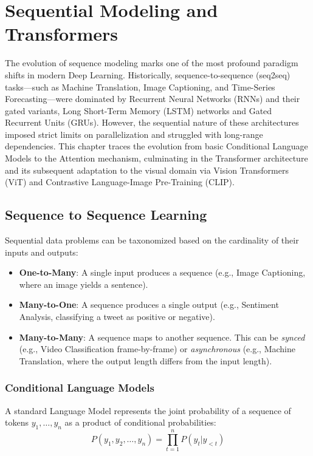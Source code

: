 \chapter{Sequential Modeling and Transformers}
\label{ch:transformers}

The evolution of sequence modeling marks one of the most profound paradigm shifts in modern Deep Learning. Historically, sequence-to-sequence (seq2seq) tasks—such as Machine Translation, Image Captioning, and Time-Series Forecasting—were dominated by Recurrent Neural Networks (RNNs) and their gated variants, Long Short-Term Memory (LSTM) networks and Gated Recurrent Units (GRUs). However, the sequential nature of these architectures imposed strict limits on parallelization and struggled with long-range dependencies. This chapter traces the evolution from basic Conditional Language Models to the Attention mechanism, culminating in the Transformer architecture and its subsequent adaptation to the visual domain via Vision Transformers (ViT) and Contrastive Language-Image Pre-Training (CLIP).

\section{Sequence to Sequence Learning}
\label{sec:seq2seq}

Sequential data problems can be taxonomized based on the cardinality of their inputs and outputs:
\begin{itemize}
    \item \textbf{One-to-Many}: A single input produces a sequence (e.g., Image Captioning, where an image yields a sentence).
    \item \textbf{Many-to-One}: A sequence produces a single output (e.g., Sentiment Analysis, classifying a tweet as positive or negative).
    \item \textbf{Many-to-Many}: A sequence maps to another sequence. This can be \textit{synced} (e.g., Video Classification frame-by-frame) or \textit{asynchronous} (e.g., Machine Translation, where the output length differs from the input length).
\end{itemize}

\subsection{Conditional Language Models}
A standard Language Model represents the joint probability of a sequence of tokens $y_1, \dots, y_n$ as a product of conditional probabilities:
\begin{equation}
    P(y_1, y_2, \dots, y_n) = \prod_{t=1}^n P(y_t | y_{<t})
\end{equation}

